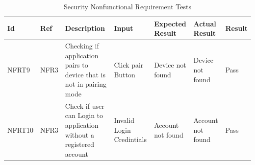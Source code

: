 \documentclass[12pt, titlepage]{article}
\begin{document}
\begin{longtable}{|p{1.4cm}|p{1cm}|p{3cm}|p{1.5cm}|p{2.5cm}|p{2cm}|p{1.2cm}|}
  \caption{Security Nonfunctional Requirement Tests}
  \label{securityNonfunctionalRequirementTests}
  \endfirsthead
  \endhead
  \hline
  \textbf{Id} & \textbf{Ref} & \textbf{Description}                                                         & \textbf{Input}                                    & \textbf{Expected Result}    & \textbf{Actual Result}                          & \textbf{Result}                                     \\ \hline
  NFRT9        & NFR3          & Checking if application pairs to device that is not in pairing mode              & Click pair Button & Device not found & Device not found & {\color[HTML]{32CB00} Pass}                         \\ \hline
  NFRT10        & NFR3          & Check if user can Login to application without a registered account           & Invalid Login Credintials   &  Account not found      & Account not found    & {\color[HTML]{32CB00} Pass}                         \\ \hline
\end{longtable}
\end{document}
